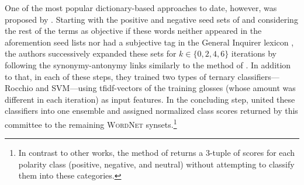 
One of the most popular dictionary-based approaches to date, however,
was proposed by \citet{Esuli:06c}.  Starting with the positive and
negative seed sets of \citet{Turney:03} and considering the rest of
the terms as objective if these words neither appeared in the
aforemention seed lists nor had a subjective tag in the General
Inquirer lexicon \cite{Stone:66}, the authors successively expanded
these sets for $k \in \{0, 2, 4, 6\}$ iterations by following the
synonymy-antonymy links similarly to the method of \citet{Hu:04}.  In
addition to that, in each of these steps, they trained two types of
ternary classifiers---Rocchio and SVM---using tfidf-vectors of the
training glosses (whose amount was different in each iteration) as
input features.  In the concluding step, \citet{Esuli:06c} united
these classifiers into one ensemble and assigned normalized class
scores returned by this committee to the remaining \textsc{WordNet}
synsets.\footnote{In contrast to other works, the method of
  \citet{Esuli:06c} returns a 3-tuple of scores for each polarity
  class (positive, negative, and neutral) without attempting to
  classify them into these categories.}

